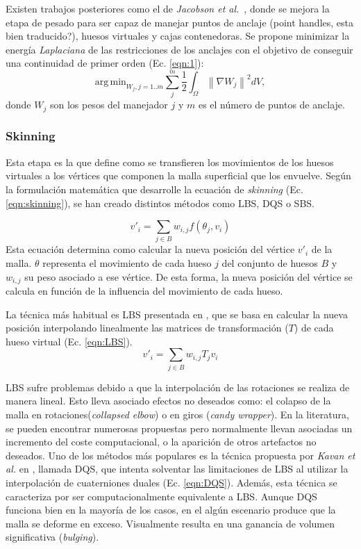 Existen trabajos posteriores como el de \emph{Jacobson et al.}~\cite{Jacobson:2011}, donde se mejora la etapa de pesado para ser capaz de manejar puntos de anclaje (point handles, esta bien traducido?), huesos virtuales y cajas contenedoras. Se propone minimizar la energía \emph{Laplaciana} de las restricciones de los anclajes con el objetivo de conseguir una continuidad  de primer orden (Ec. \ref{eqn:1}):
\begin{equation}
\label{eqn:1}
\mathrm{arg\,min}_{W_j, j=1..m}\sum_{j}^m\frac{1}{2}\int_\Omega \left \|  \nabla W_j\right \|^2 dV,
\end{equation}
donde $W_j$ son los pesos del manejador $j$ y $m$ es el número de puntos de anclaje. 

\subsubsection{Skinning}
\label{art:skinning}

Esta etapa es la que define como se transfieren los movimientos de los huesos virtuales a los vértices que componen la malla superficial que los envuelve. Según la formulación matemática que desarrolle la ecuación de \emph{skinning} (Ec. \ref{eqn:skinning}), se han creado distintos métodos como \ac{LBS}, \ac{DQS} o \ac{SBS}.

\begin{equation}
\label{eqn:skinning}
v'_{i} = \sum_{j \in B} w_{i,j}f(\theta_{j},v_{i}) 
\end{equation}
Esta ecuación determina como calcular la nueva posición del vértice $v'_{i}$ de la malla. $\theta$ representa el movimiento de cada hueso $j$ del conjunto de huesos $B$ y $w_{i,j}$ su peso asociado a ese vértice. De esta forma, la nueva posición del vértice se calcula en función de la influencia del movimiento de cada hueso.

La técnica más habitual es \ac{LBS} presentada en \cite{thalmann88}, que se basa en calcular la nueva posición interpolando linealmente las matrices de transformación ($T$) de cada hueso virtual (Ec. \ref{eqn:LBS}).
\begin{equation}
\label{eqn:LBS}
v'_{i} = \sum_{j \in B} w_{i,j}T_{j}v_{i}
\end{equation}

\ac{LBS} sufre problemas debido a que la interpolación de las rotaciones se realiza de manera lineal. Esto lleva asociado efectos no deseados como: el colapso de la malla  en rotaciones(\emph{collapsed elbow}) o en giros (\emph{candy wrapper}). En la literatura, se pueden encontrar numerosas propuestas \cite{rumman2016state} pero normalmente llevan asociadas un incremento del coste computacional, o la aparición de otros artefactos no deseados. Uno de los métodos más populares es la técnica propuesta por \emph{Kavan et al.} en \cite{Kavan2008}, llamada \ac{DQS}, que intenta solventar las limitaciones de \ac{LBS} al utilizar la interpolación de cuaterniones duales (Ec. \ref{eqn:DQS}). Además, esta técnica se caracteriza por ser computacionalmente equivalente a \ac{LBS}. Aunque \ac{DQS} funciona bien en la mayoría de los casos, en el algún escenario produce que la malla se deforme en exceso. Visualmente resulta en una ganancia de volumen significativa (\emph{bulging}). 

